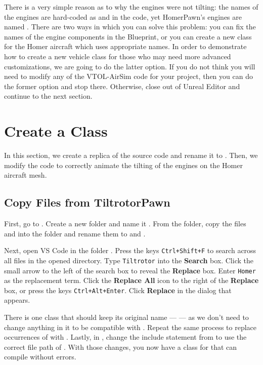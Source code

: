 There is a very simple reason as to why the engines were not tilting: the names of the engines are hard-coded as  and  in the \CC code, yet HomerPawn's engines are named . There are two ways in which you can solve this problem: you can fix the names of the engine components in the Blueprint, or you can create a new \CC class for the Homer aircraft which uses appropriate names. In order to demonstrate how to create a new vehicle \CC class for those who may need more advanced customizations, we are going to do the latter option. If you do not think you will need to modify any of the VTOL-AirSim code for your project, then you can do the former option and stop there. Otherwise, close out of Unreal Editor and continue to the next section.

\section{Create a \texorpdfstring{\CCh}{C++} Class}\label{sec:cpp_class}
In this section, we create a replica of the  source code and rename it to . Then, we modify the code to correctly animate the tilting of the engines on the Homer aircraft mesh.

\subsection{Copy Files from TiltrotorPawn}
First, go to . Create a new folder and name it . From the  folder, copy the files  and  into the  folder and rename them to  and .

Next, open VS Code in the folder . Press the keys \texttt{Ctrl+Shift+F} to search across all files in the opened directory. Type \texttt{Tiltrotor} into the \textbf{Search} box. Click the small arrow to the left of the search box to reveal the \textbf{Replace} box. Enter \texttt{Homer} as the replacement term. Click the \textbf{Replace All} icon to the right of the \textbf{Replace} box, or press the keys \texttt{Ctrl+Alt+Enter}. Click \textbf{Replace} in the dialog that appears.

There is one class that should keep its original name ---  --- as we don't need to change anything in it to be compatible with . Repeat the same process to replace occurrences of  with . Lastly, in , change the include statement from  to use the correct file path of . With those changes, you now have a \CC class for  that can compile without errors.

